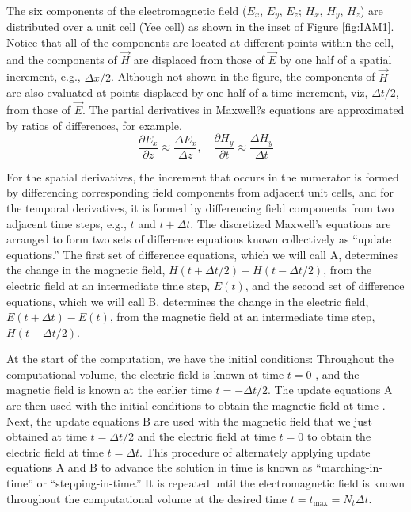 The six components of the electromagnetic field ($E_x$, $E_y$, $E_z$; $H_x$, $H_y$, $H_z$) are distributed over a unit cell (Yee cell) as shown in the inset of Figure \ref{fig:IAM1}. Notice that all of the components are located at different points within the cell, and the components of $\vec{H}$ are displaced from those of $\vec{E}$  by one half of a spatial increment, e.g., $\Delta x/2$. Although not shown in the figure, the components of  $\vec{H}$ are also evaluated at points displaced by one half of a time increment, viz, $\Delta t/2$, from those of  $\vec{E}$. The partial derivatives in Maxwell?s equations are approximated by ratios of differences, for example, 
\begin{equation}
\frac{\partial E_x}{\partial z} \approx \frac{\Delta E_x}{\Delta z}, \quad
\frac{\partial H_y}{\partial t} \approx \frac{\Delta H_y}{\Delta t}
\label{eqn:IAM1}
\end{equation}

For the spatial derivatives, the increment that occurs in the numerator is formed by differencing corresponding field components from adjacent unit cells, and for the temporal derivatives, it is formed by differencing field components from two adjacent time steps, e.g., $t$ and $t+\Delta t$. The discretized Maxwell's equations are arranged to form two sets of difference equations known collectively as ``update equations.'' The first set of difference equations, which we will call A, determines the change in the magnetic field, $H(t+\Delta t/2) - H(t-\Delta t/2)$, from the electric field at an intermediate time step, $E(t)$, and the second set of difference equations, which we will call B, determines the change in the electric field, $E(t+\Delta t)-E(t)$, from the magnetic field at an intermediate time step, $H(t+\Delta t/2)$.

At the start of the computation, we have the initial conditions: Throughout the computational volume, the electric field is known at time $t=0$ , and the magnetic field is known at the earlier time $t=-\Delta t/2$. The update equations A are then used with the initial conditions to obtain the magnetic field at time . Next, the update equations B are used with the magnetic field that we just obtained at time $t=\Delta t/2$ and the electric field at time $t=0$ to obtain the electric field at time $t=\Delta t$. This procedure of alternately applying update equations A and B to advance the solution in time is known as ``marching-in-time'' or ``stepping-in-time.'' It is repeated until the electromagnetic field is known throughout the computational volume at the desired time $t=t_\text{max}=N_t \Delta t$.

